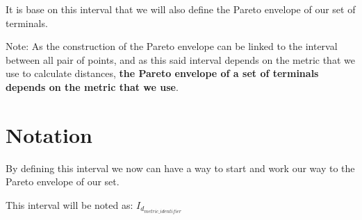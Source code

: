 It is base on this interval that we will also define the Pareto envelope of our set of terminals.

Note: As the construction of the Pareto envelope can be linked to the interval between all pair of points, and as this said interval depends on the metric that we use to calculate distances, \textbf{the Pareto envelope of a set of terminals depends on the metric that we use}.

\section{Notation}
By defining this interval we now can have a way to start and work our way to the Pareto envelope of our set. 

\noindent This interval will be noted as: $I_{d_{metric\_identifier}}$